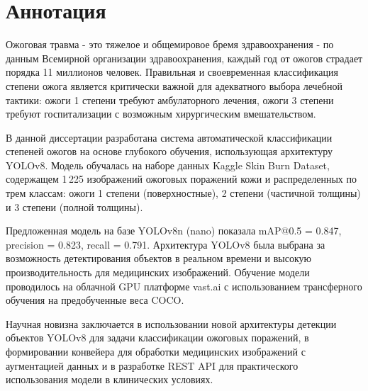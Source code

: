 \chapter{Аннотация}
\begin{SingleSpace}

\noindent Ожоговая травма - это тяжелое и общемировое бремя здравоохранения - по данным Всемирной организации здравоохранения, каждый год от ожогов страдает порядка 11 миллионов человек. Правильная и своевременная классификация степени ожога является критически важной для адекватного выбора лечебной тактики: ожоги 1 степени требуют амбулаторного лечения, ожоги 3 степени требуют госпитализации с возможным хирургическим вмешательством.

\noindent В данной диссертации разработана система автоматической классификации степеней ожогов на основе глубокого обучения, использующая архитектуру YOLOv8. Модель обучалась на наборе данных Kaggle Skin Burn Dataset, содержащем 1\,225 изображений ожоговых поражений кожи и распределенных по трем классам: ожоги 1 степени (поверхностные), 2 степени (частичной толщины) и 3 степени (полной толщины).

\noindent Предложенная модель на базе YOLOv8n (nano) показала mAP@0.5 = 0.847, precision = 0.823, recall = 0.791. Архитектура YOLOv8 была выбрана за возможность детектирования объектов в реальном времени и высокую производительность для медицинских изображений. Обучение модели проводилось на облачной GPU платформе vast.ai с использованием трансферного обучения на предобученные веса COCO.

\noindent Научная новизна заключается в использовании новой архитектуры детекции объектов YOLOv8 для задачи классификации ожоговых поражений, в формировании конвейера для обработки медицинских изображений с аугментацией данных и в разработке REST API для практического использования модели в клинических условиях.

\vspace{0.8em}

\end{SingleSpace}

